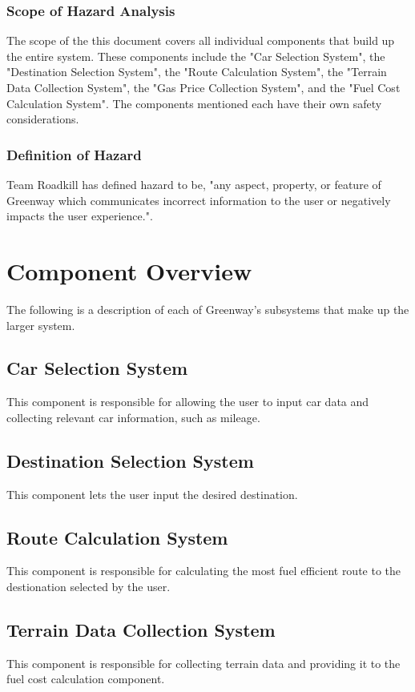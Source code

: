 \documentclass{article}
\begin{document}
\subsubsection{Scope of Hazard Analysis}
The scope of the this document covers all individual components that build up the entire system. These components include the "Car Selection System", the "Destination Selection System", the "Route Calculation System", the "Terrain Data Collection System", the "Gas Price Collection System", and the "Fuel Cost Calculation System". The components mentioned each have their own safety considerations.

\subsubsection{Definition of Hazard}
Team Roadkill has defined hazard to be, "any aspect, property, or feature of Greenway which communicates incorrect information to the user or negatively impacts the user experience.".


\section{Component Overview}
The following is a description of each of Greenway's subsystems that make up the larger system.

\subsection{Car Selection System}
This component is responsible for allowing the user to input car data and collecting relevant car information, such as mileage.

\subsection{Destination Selection System}
This component lets the user input the desired destination.

\subsection{Route Calculation System}
This component is responsible for calculating the most fuel efficient route to the destionation selected by the user.

\subsection{Terrain Data Collection System}
This component is responsible for collecting terrain data and providing it to the fuel cost calculation component.
\end{document}
